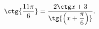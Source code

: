 \begin{ex}[type=equation]
	\begin{condition}
		$\ \ctg {\dfrac{11\pi}{6}} = \dfrac{2\ctg x + 3}{\tg {\left(x+\dfrac{\pi}{6}\right)}}. $
	\end{condition}
\end{ex}